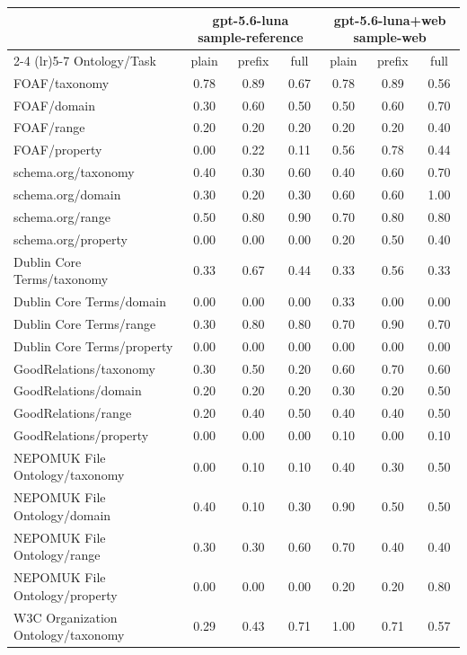 \begin{tabular}{lcccccc}
\toprule
 & \multicolumn{3}{c}{gpt-5.6-luna sample-reference} & \multicolumn{3}{c}{gpt-5.6-luna+web sample-web} \\
\cmidrule(lr){2-4} \cmidrule(lr){5-7}
Ontology/Task & plain & prefix & full & plain & prefix & full \\
\midrule
FOAF/taxonomy & 0.78 & 0.89 & 0.67 & 0.78 & 0.89 & 0.56 \\
FOAF/domain & 0.30 & 0.60 & 0.50 & 0.50 & 0.60 & 0.70 \\
FOAF/range & 0.20 & 0.20 & 0.20 & 0.20 & 0.20 & 0.40 \\
FOAF/property & 0.00 & 0.22 & 0.11 & 0.56 & 0.78 & 0.44 \\
schema.org/taxonomy & 0.40 & 0.30 & 0.60 & 0.40 & 0.60 & 0.70 \\
schema.org/domain & 0.30 & 0.20 & 0.30 & 0.60 & 0.60 & 1.00 \\
schema.org/range & 0.50 & 0.80 & 0.90 & 0.70 & 0.80 & 0.80 \\
schema.org/property & 0.00 & 0.00 & 0.00 & 0.20 & 0.50 & 0.40 \\
Dublin Core Terms/taxonomy & 0.33 & 0.67 & 0.44 & 0.33 & 0.56 & 0.33 \\
Dublin Core Terms/domain & 0.00 & 0.00 & 0.00 & 0.33 & 0.00 & 0.00 \\
Dublin Core Terms/range & 0.30 & 0.80 & 0.80 & 0.70 & 0.90 & 0.70 \\
Dublin Core Terms/property & 0.00 & 0.00 & 0.00 & 0.00 & 0.00 & 0.00 \\
GoodRelations/taxonomy & 0.30 & 0.50 & 0.20 & 0.60 & 0.70 & 0.60 \\
GoodRelations/domain & 0.20 & 0.20 & 0.20 & 0.30 & 0.20 & 0.50 \\
GoodRelations/range & 0.20 & 0.40 & 0.50 & 0.40 & 0.40 & 0.50 \\
GoodRelations/property & 0.00 & 0.00 & 0.00 & 0.10 & 0.00 & 0.10 \\
NEPOMUK File Ontology/taxonomy & 0.00 & 0.10 & 0.10 & 0.40 & 0.30 & 0.50 \\
NEPOMUK File Ontology/domain & 0.40 & 0.10 & 0.30 & 0.90 & 0.50 & 0.50 \\
NEPOMUK File Ontology/range & 0.30 & 0.30 & 0.60 & 0.70 & 0.40 & 0.40 \\
NEPOMUK File Ontology/property & 0.00 & 0.00 & 0.00 & 0.20 & 0.20 & 0.80 \\
W3C Organization Ontology/taxonomy & 0.29 & 0.43 & 0.71 & 1.00 & 0.71 & 0.57 \\

\end{tabular}
